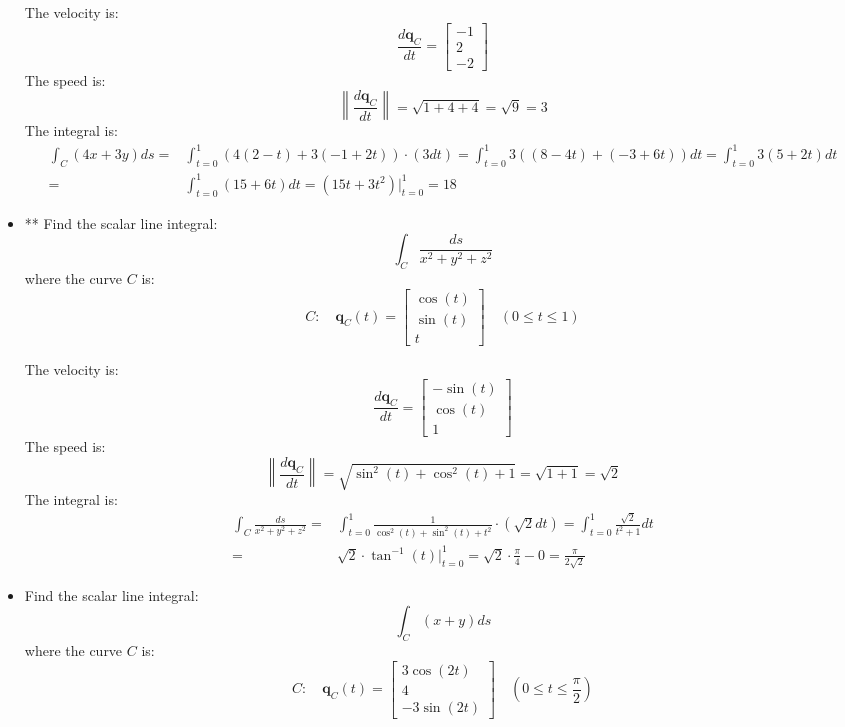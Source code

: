 \documentclass{article}
\begin{document}
\begin{itemize}
The velocity is:
\[\frac{d\mathbf{q}_C}{dt} = \begin{bmatrix} -1 \\ 2 \\ -2 \end{bmatrix}\]
The speed is:
\[\left\|\frac{d\mathbf{q}_C}{dt}\right\| 
= \sqrt{1 + 4 + 4}
= \sqrt{9} = 3\]
The integral is:
\begin{align*}
\int_C (4x + 3y)ds = & \int_{t = 0}^1 (4(2 - t) + 3(-1 + 2t)) \cdot (3dt) 
= \int_{t = 0}^1 3((8 - 4t) + (-3 + 6t)) dt 
= \int_{t = 0}^1 3(5 + 2t) dt \\
= & \int_{t = 0}^1 (15 + 6t) dt 
= (15t + 3t^2)\Big|_{t=0}^1 
= 18
\end{align*}

\item**
Find the scalar line integral: 
\[\int_C \frac{ds}{x^2 + y^2 + z^2}\]
where the curve \(C\) is:
\[C : \quad 
\mathbf{q}_C(t) = \begin{bmatrix} 
\cos(t) \\ \sin(t) \\ t
\end{bmatrix} \quad 
(0 \leq t \leq 1)\]

The velocity is:
\[\frac{d\mathbf{q}_C}{dt} = \begin{bmatrix} 
-\sin(t) \\ \cos(t) \\ 1
\end{bmatrix}\]
The speed is:
\[\left\|\frac{d\mathbf{q}_C}{dt}\right\| = \sqrt{\sin^2(t) + \cos^2(t) + 1} = \sqrt{1 + 1} = \sqrt{2}\]
The integral is:
\begin{align*}
\int_C \frac{ds}{x^2 + y^2 + z^2} 
= & \int_{t = 0}^1 \frac{1}{\cos^2(t) + \sin^2(t) + t^2} \cdot (\sqrt{2} dt) 
= \int_{t = 0}^1 \frac{\sqrt{2}}{t^2 + 1} dt \\ 
= & \sqrt{2} \cdot \tan^{-1}(t)\Big|_{t = 0}^1 
= \sqrt{2} \cdot \frac{\pi}{4} - 0 
= \frac{\pi}{2\sqrt{2}}
\end{align*}

\item
Find the scalar line integral: 
\[\int_C (x + y) ds\]
where the curve \(C\) is:
\[C : \quad 
\mathbf{q}_C(t) = \begin{bmatrix} 
3\cos(2t) \\ 4 \\ -3\sin(2t) 
\end{bmatrix} \quad 
(0 \leq t \leq \frac{\pi}{2})\]


\end{itemize}
\end{document}
